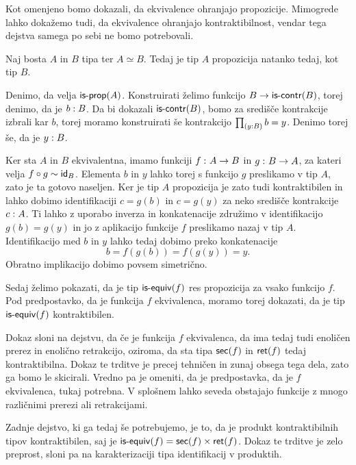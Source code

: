 Kot omenjeno bomo dokazali, da ekvivalence ohranjajo propozicije. Mimogrede lahko dokažemo tudi, da ekvivalence ohranjajo kontraktibilnost, vendar tega dejstva samega po sebi ne bomo potrebovali.

\begin{trditev}
  Naj bosta \(A\) in \(B\) tipa ter \(A \simeq B\). Tedaj je tip \(A\) propozicija natanko tedaj, kot tip \(B\).
\end{trditev}

\begin{dokaz}
  Denimo, da velja \(\textnormal{\textsf{is-prop}}(A)\). Konstruirati želimo funkcijo \(B \to \textnormal{\textsf{is-contr}}(B)\), torej denimo, da je \(b : B\). Da bi dokazali \(\textnormal{\textsf{is-contr}}(B)\), bomo za središče kontrakcije izbrali kar \(b\), torej moramo konstruirati še kontrakcijo
  \(\textstyle \prod_{\left( y : B \right)} b = y\). Denimo torej še, da je \(y : B\).

  Ker sta \(A\) in \(B\) ekvivalentna, imamo funkciji \(f \,\colon A \to B\) in
  \(g \,\colon B \to A\), za kateri velja \(f \circ g \sim \textnormal{\textsf{id}}_{B}\). Elementa \(b\) in \(y\) lahko torej s funkcijo \(g\) preslikamo v tip \(A\), zato je ta gotovo naseljen. Ker je tip \(A\) propozicija je zato tudi kontraktibilen in lahko dobimo identifikaciji \(c = g(b)\) in \(c = g(y)\) za neko središče kontrakcije \(c : A\). Ti lahko z uporabo inverza in konkatenacije združimo v identifikacijo \(g(b) = g(y)\) in jo z aplikacijo funkcije \(f\) preslikamo nazaj v tip \(A\). Identifikacijo med \(b\) in \(y\) lahko tedaj dobimo preko konkatenacije
  \[b = f(g(b)) = f(g(y)) = y.\]
  Obratno implikacijo dobimo povsem simetrično.
\end{dokaz}

Sedaj želimo pokazati, da je tip \(\textnormal{\textsf{is-equiv}}(f)\) res propozicija za vsako funkcijo \(f\). Pod predpostavko, da je funkcija \(f\) ekvivalenca, moramo torej dokazati, da je tip \(\textnormal{\textsf{is-equiv}}(f)\) kontraktibilen.

Dokaz sloni na dejstvu, da če je funkcija \(f\) ekvivalenca, da ima tedaj tudi enoličen prerez in enolično retrakcijo, oziroma, da sta tipa \(\textnormal{\textsf{sec}}(f)\) in \(\textnormal{\textsf{ret}}(f)\) tedaj kontraktibilna.
Dokaz te trditve je precej tehničen in zunaj obsega tega dela, zato ga bomo le skicirali. Vredno pa je omeniti, da je predpostavka, da je \(f\) ekvivalenca, tukaj potrebna. V splošnem lahko seveda obstajajo funkcije z mnogo različnimi prerezi ali retrakcijami.

Zadnje dejstvo, ki ga tedaj še potrebujemo, je to, da je produkt kontraktibilnih tipov kontraktibilen, saj je \(\textnormal{\textsf{is-equiv}}(f) = \textnormal{\textsf{sec}}(f) \times \textnormal{\textsf{ret}}(f)\). Dokaz te trditve je zelo preprost, sloni pa na karakterizaciji tipa identifikacij v produktih.

